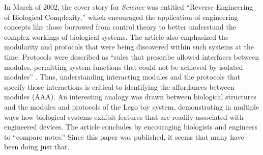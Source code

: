 In March of 2002, the cover story for \textit{Science} was entitled
``Reverse Engineering of Biological Complexity,'' \citep{csetedoyle2002}
which encouraged the application of engineering concepts like those
borrowed from control theory to better understand the complex workings
of biological systems. The article also emphasized the modularity and
protocols that were being discovered within such systems at the time.
Protocols were described as ``rules that prescribe allowed interfaces
between modules, permitting system functions that could not be achieved
by isolated modules'' \citep[][p.~1666]{csetedoyle2002}.  Thus, understanding interacting modules and the
protocols that specify those interactions is critical to identifying
the affordances between modules (AAA). An interesting analogy was drawn
between biological structures and the modules and protocols of the Lego
toy system, demonstrating in multiple ways how biological systems
exhibit features that are readily associated with engineered devices.
The article concludes by encouraging biologists and engineers to
``compare notes.'' Since this paper was published, it seems that many
have been doing just that. 

